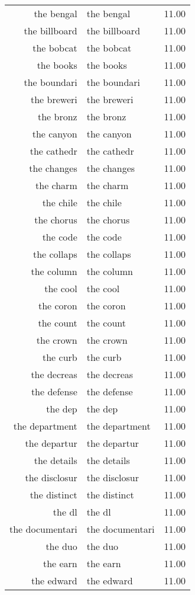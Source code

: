 \begin{table}[ht]
\begin{tabular}{rlr}
  the bengal & the bengal & 11.00 \\ 
  the billboard & the billboard & 11.00 \\ 
  the bobcat & the bobcat & 11.00 \\ 
  the books & the books & 11.00 \\ 
  the boundari & the boundari & 11.00 \\ 
  the breweri & the breweri & 11.00 \\ 
  the bronz & the bronz & 11.00 \\ 
  the canyon & the canyon & 11.00 \\ 
  the cathedr & the cathedr & 11.00 \\ 
  the changes & the changes & 11.00 \\ 
  the charm & the charm & 11.00 \\ 
  the chile & the chile & 11.00 \\ 
  the chorus & the chorus & 11.00 \\ 
  the code & the code & 11.00 \\ 
  the collaps & the collaps & 11.00 \\ 
  the column & the column & 11.00 \\ 
  the cool & the cool & 11.00 \\ 
  the coron & the coron & 11.00 \\ 
  the count & the count & 11.00 \\ 
  the crown & the crown & 11.00 \\ 
  the curb & the curb & 11.00 \\ 
  the decreas & the decreas & 11.00 \\ 
  the defense & the defense & 11.00 \\ 
  the dep & the dep & 11.00 \\ 
  the department & the department & 11.00 \\ 
  the departur & the departur & 11.00 \\ 
  the details & the details & 11.00 \\ 
  the disclosur & the disclosur & 11.00 \\ 
  the distinct & the distinct & 11.00 \\ 
  the dl & the dl & 11.00 \\ 
  the documentari & the documentari & 11.00 \\ 
  the duo & the duo & 11.00 \\ 
  the earn & the earn & 11.00 \\ 
  the edward & the edward & 11.00 \\ 

\end{tabular}
\end{table}
